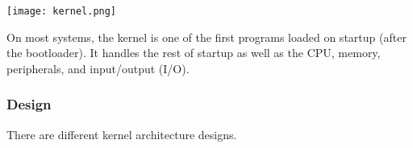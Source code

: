 \vspace{-10pt}
\begin{center}
    \texttt{[image: kernel.png]}
    \vspace{-10pt}
\end{center}


On most systems, the kernel is one of the first programs loaded on startup (after the bootloader). It handles the rest of startup as well as the CPU,  memory, peripherals, and input/output (I/O).


\subsubsection{Design}

There are different kernel architecture designs.

